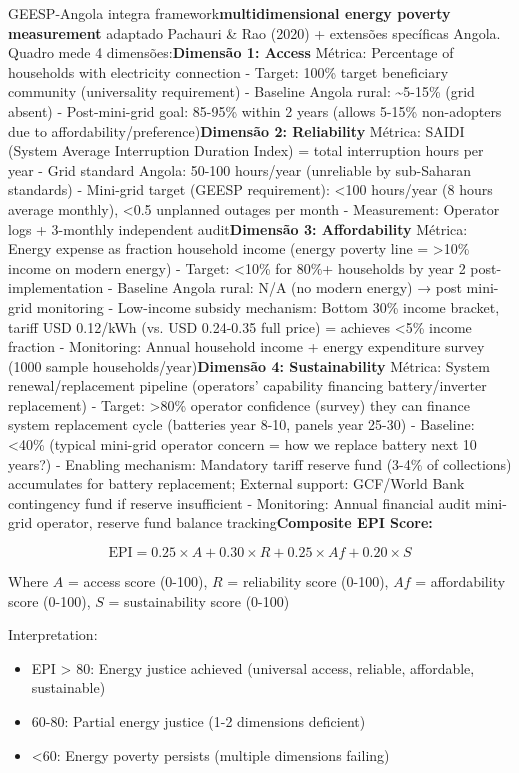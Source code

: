 \documentclass[12pt, a4paper]{article}
\begin{document}
GEESP-Angola integra framework\textbf{multidimensional energy poverty measurement} adaptado Pachauri \& Rao (2020) + extensões specíficas Angola. Quadro mede 4 dimensões:\textbf{Dimensão 1: Access}
Métrica: Percentage of households with electricity connection
- Target: 100\% target beneficiary community (universality requirement)
- Baseline Angola rural: \textasciitilde{}5-15\% (grid absent)
- Post-mini-grid goal: 85-95\% within 2 years (allows 5-15\% non-adopters due to affordability/preference)\textbf{Dimensão 2: Reliability}
Métrica: SAIDI (System Average Interruption Duration Index) = total interruption hours per year
- Grid standard Angola: 50-100 hours/year (unreliable by sub-Saharan standards)
- Mini-grid target (GEESP requirement): <100 hours/year (8 hours average monthly), <0.5 unplanned outages per month
- Measurement: Operator logs + 3-monthly independent audit\textbf{Dimensão 3: Affordability}
Métrica: Energy expense as fraction household income (energy poverty line = >10\% income on modern energy)
- Target: <10\% for 80\%+ households by year 2 post-implementation
- Baseline Angola rural: N/A (no modern energy) → post mini-grid monitoring
- Low-income subsidy mechanism: Bottom 30\% income bracket, tariff USD 0.12/kWh (vs. USD 0.24-0.35 full price) = achieves <5\% income fraction
- Monitoring: Annual household income + energy expenditure survey (1000 sample households/year)\textbf{Dimensão 4: Sustainability}
Métrica: System renewal/replacement pipeline (operators' capability financing battery/inverter replacement)
- Target: >80\% operator confidence (survey) they can finance system replacement cycle (batteries year 8-10, panels year 25-30)
- Baseline: <40\% (typical mini-grid operator concern = how we replace battery next 10 years?)
- Enabling mechanism: Mandatory tariff reserve fund (3-4\% of collections) accumulates for battery replacement; External support: GCF/World Bank contingency fund if reserve insufficient
- Monitoring: Annual financial audit mini-grid operator, reserve fund balance tracking\textbf{Composite EPI Score:}

$$\text{EPI} = 0.25 \times A + 0.30 \times R + 0.25 \times Af + 0.20 \times S$$

Where $A$ = access score (0-100), $R$ = reliability score (0-100), $Af$ = affordability score (0-100), $S$ = sustainability score (0-100)

Interpretation:
\begin{itemize}
\item EPI > 80: Energy justice achieved (universal access, reliable, affordable, sustainable)
\item 60-80: Partial energy justice (1-2 dimensions deficient)
\item <60: Energy poverty persists (multiple dimensions failing)
\end{itemize}
\end{document}
